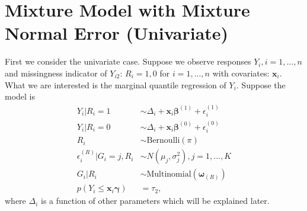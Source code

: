 \section{Mixture Model with Mixture Normal Error (Univariate)}

First we consider the univariate case.
Suppose we observe responses $Y_i, i = 1, ..., n$ and missingness indicator of $Y_{i2}$: $R_i = 1, 0$ for $i = 1, ..., n$ with covariates: $\bm x_{i}$.
What we are interested is the marginal quantile regression of $Y_i$.
Suppose the model is
\begin{align*}
Y_i | R_i = 1                   & \sim \Delta_i + \bm x_i \bm \beta^{(1)} + \epsilon_i^{(1)} \\
Y_i | R_i = 0                   & \sim \Delta_i + \bm x_i \bm \beta^{(0)} + \epsilon_i^{(0)} \\
R_i                             & \sim \mbox{Bernoulli}(\pi)                                 \\
\epsilon_i^{(R)} | G_i= j, R_i  & \sim N(\mu_j, \sigma_j^2) , j = 1, ..., K                  \\
G_i | R_i                       & \sim \mbox{Multinomial}(\bm \omega_{(R)})                  \\
p( Y_i \leq \bm x_i \bm \gamma) & = \tau_2,
\end{align*}
where $\Delta_i$ is a function of other parameters which will be explained later.


